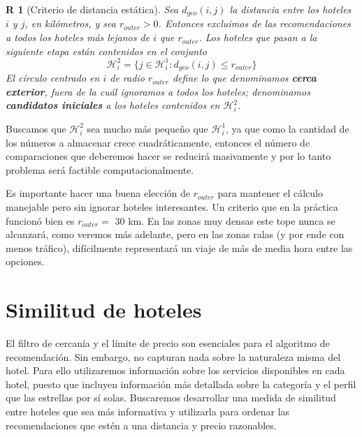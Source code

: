 \documentclass[12pt]{report}
\newtheorem{regla}{R}%
\begin{document}
\begin{regla}[Criterio de distancia estática]
Sea $d_{geo}(i,j)$ la distancia entre los hoteles $i$ y $j$, en kilómetros, y sea $r_{outer} > 0$. Entonces excluimos de las recomendaciones a todos los hoteles más lejanos de $i$ que $r_{outer}$. Los hoteles que pasan a la siguiente etapa están contenidos en el conjunto
\[
\mathcal{H}_i^2 = \{j \in \mathcal{H}_i^1 : d_{geo}(i,j) \leq r_{outer}\}
\]
El círculo centrado en $i$ de radio $r_{outer}$ define lo que denominamos \textbf{cerca exterior}, fuera de la cuál ignoramos a todos los hoteles; denominamos \textbf{candidatos iniciales} a los hoteles contenidos en $\mathcal{H}_i^2$.
\end{regla}
Buscamos que $\mathcal{H}_i^2$ sea mucho más pequeño que $\mathcal{H}_i^1$, ya que como la cantidad de los números a almacenar crece cuadráticamente, entonces el número de comparaciones que deberemos hacer se reducirá masivamente y por lo tanto problema será factible computacionalmente.

Es importante hacer una buena elección de $r_{outer}$ para mantener el cálculo manejable pero sin ignorar hoteles interesantes. Un criterio que en la práctica funcionó bien es $r_{outer} =$ 30 km. En las zonas muy densas este tope nunca se alcanzará, como veremos más adelante, pero en las zonas ralas (y por ende con menos tráfico), difícilmente representará un viaje de más de media hora entre las opciones.

\section{Similitud de hoteles}

El filtro de cercanía y el límite de precio son esenciales para el algoritmo de recomendación. Sin embargo, no capturan nada sobre la naturaleza misma del hotel. Para ello utilizaremos información sobre los servicios disponibles en cada hotel, puesto que incluyen información más detallada sobre la categoría y el perfil que las estrellas por sí solas. Buscaremos desarrollar una medida de similitud entre hoteles que sea más informativa y utilizarla para ordenar las recomendaciones que estén a una distancia y precio razonables.
\end{document}
